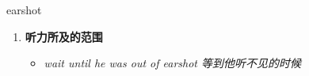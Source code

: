
\begin{frame}
{\huge earshot}
\begin{center}
\begin{enumerate}\Large
  \item \textbf{听力所及的范围}
  \begin{itemize}
    \item \em{\Large{wait until he was out of earshot 等到他听不见的时候}}
  \end{itemize}
\end{enumerate}
\end{center}
\end{frame}
